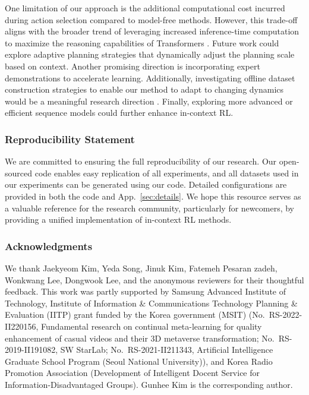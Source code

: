 \documentclass{article}
\begin{document}
One limitation of our approach is the additional computational cost incurred during action selection compared to model-free methods.
However, this trade-off aligns with the broader trend of leveraging increased inference-time computation to maximize the reasoning capabilities of Transformers \citep{GPT3, COT}.
Future work could explore adaptive planning strategies that dynamically adjust the planning scale based on context.
Another promising direction is incorporating expert demonstrations to accelerate learning.
Additionally, investigating offline dataset construction strategies to enable our method to adapt to changing dynamics would be a meaningful research direction \citep{MCL-TF, MCL-SB, MCL-Survey}.
Finally, exploring more advanced or efficient sequence models could further enhance in-context RL.

\subsubsection*{Reproducibility Statement}

We are committed to ensuring the full reproducibility of our research.
Our open-sourced code enables easy replication of all experiments, and all datasets used in our experiments can be generated using our code.
Detailed configurations are provided in both the code and App.~\ref{sec:details}.
We hope this resource serves as a valuable reference for the research community, particularly for newcomers, by providing a unified implementation of in-context RL methods.


\subsubsection*{Acknowledgments}

We thank Jaekyeom Kim, Yeda Song, Jinuk Kim, Fatemeh Pesaran zadeh, Wonkwang Lee, Dongwook Lee, and the anonymous reviewers for their thoughtful feedback.
This work was partly supported by Samsung Advanced Institute of Technology,
Institute of Information \& Communications Technology Planning \& Evaluation (IITP) grant funded by the Korea government (MSIT) (No.~RS-2022-II220156, Fundamental research on continual meta-learning for quality enhancement of casual videos and their 3D metaverse transformation; No.~RS-2019-II191082, SW StarLab; No.~RS-2021-II211343, Artificial Intelligence Graduate School Program (Seoul National University)),
and Korea Radio Promotion Association (Development of Intelligent Docent Service for Information-Disadvantaged Groups).
Gunhee Kim is the corresponding author.
\end{document}
